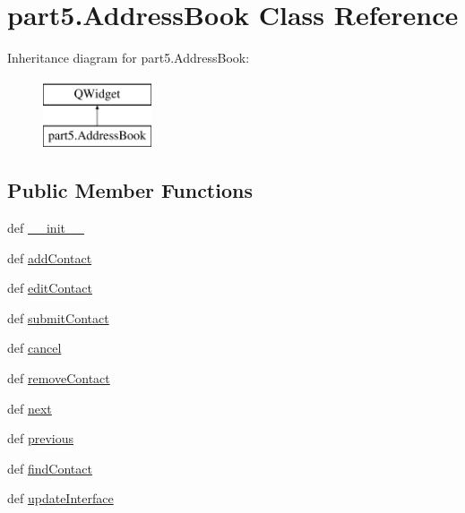 \hypertarget{classpart5_1_1AddressBook}{}\section{part5.\+Address\+Book Class Reference}
\label{classpart5_1_1AddressBook}
Inheritance diagram for part5.\+Address\+Book\+:\begin{figure}[H]
\begin{center}
\leavevmode
\includegraphics[height=2.000000cm]{classpart5_1_1AddressBook}
\end{center}
\end{figure}
\subsection*{Public Member Functions}
\begin{DoxyCompactItemize}
\item 
def \hyperlink{classpart5_1_1AddressBook_a6568a070e67b19e367044d22e313fd7c}{\+\_\+\+\_\+init\+\_\+\+\_\+}
\item 
def \hyperlink{classpart5_1_1AddressBook_a2552f4de8d5c87912b8ba8a8ecd60cdb}{add\+Contact}
\item 
def \hyperlink{classpart5_1_1AddressBook_ac74605ffee33e4193d983d2f93b7174b}{edit\+Contact}
\item 
def \hyperlink{classpart5_1_1AddressBook_aded3cd397355bb586e31429f28e6c3bf}{submit\+Contact}
\item 
def \hyperlink{classpart5_1_1AddressBook_a70287ad4126644c2280f8fa7359cdc07}{cancel}
\item 
def \hyperlink{classpart5_1_1AddressBook_a60e6d4f2edbbb6624db0b2e23eb992fb}{remove\+Contact}
\item 
def \hyperlink{classpart5_1_1AddressBook_a1bf4c9c68ff9a6bd2224f79f5638e2ca}{next}
\item 
def \hyperlink{classpart5_1_1AddressBook_a22fc120ee118e2f35ded5b2abc6280c5}{previous}
\item 
def \hyperlink{classpart5_1_1AddressBook_ac2bf0d9e62281a5bbcd7ad653904638c}{find\+Contact}
\item 
def \hyperlink{classpart5_1_1AddressBook_a67d0909e91016cba6037a3a4a60639bd}{update\+Interface}
\end{DoxyCompactItemize}
